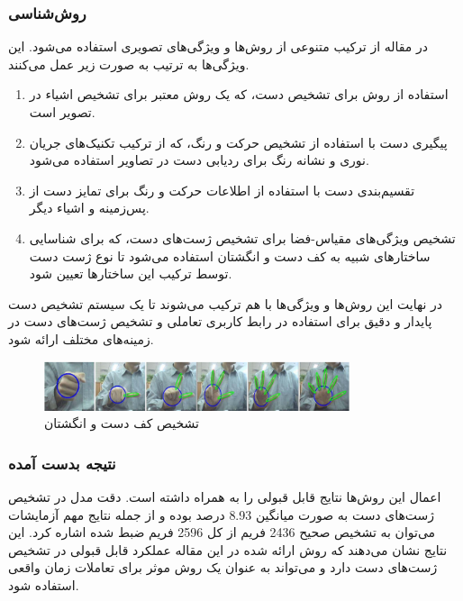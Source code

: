 \subsubsection{روش‌شناسی}
در مقاله از ترکیب متنوعی از روش‌ها و ویژگی‌های تصویری استفاده می‌شود. این ویژگی‌ها به ترتیب به صورت زیر عمل می‌کنند.
\begin{enumerate}
    \item استفاده از روش  برای تشخیص دست، که یک روش معتبر برای تشخیص اشیاء در تصویر است.
    \item پیگیری دست با استفاده از تشخیص حرکت و رنگ، که از ترکیب تکنیک‌های جریان نوری و نشانه رنگ برای ردیابی دست در تصاویر استفاده می‌شود.
    \item تقسیم‌بندی دست با استفاده از اطلاعات حرکت و رنگ برای تمایز دست از پس‌زمینه و اشیاء دیگر. 
    \item تشخیص ویژگی‌های مقیاس-فضا برای تشخیص ژست‌های دست، که برای شناسایی ساختارهای شبیه به کف دست و انگشتان استفاده می‌شود تا نوع ژست دست توسط ترکیب این ساختارها تعیین شود.
\end{enumerate}
  در نهایت این روش‌ها و ویژگی‌ها با هم ترکیب می‌شوند تا یک سیستم تشخیص دست پایدار و دقیق برای استفاده در رابط کاربری تعاملی و تشخیص ژست‌های دست در زمینه‌های مختلف ارائه شود.

\begin{figure}[h]
    \centering
    \includegraphics[width=0.8\textwidth]{hand_gesture_feature.png}
    \caption{تشخیص کف دست و انگشتان}
\end{figure}

\subsubsection{نتیجه بدست آمده}
اعمال این روش‌ها نتایج قابل قبولی را به همراه داشته است. دقت مدل در تشخیص ژست‌های دست به صورت میانگین 8.93 درصد بوده و از جمله نتایج مهم آزمایشات می‌توان به تشخیص 
صحیح 2436 فریم از کل 2596 فریم ضبط شده اشاره کرد. این نتایج نشان می‌دهند که روش ارائه شده در این مقاله عملکرد قابل قبولی در تشخیص ژست‌های دست دارد و 
می‌تواند به عنوان یک روش موثر برای تعاملات زمان واقعی استفاده شود.




